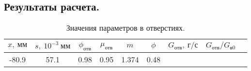 \documentclass[a4paper,10pt]{article}
\begin{document}
%    

    \subsection{Результаты расчета.}

    
    \begin{longtable}{
     |
%    
    c|
%    
    c|
%    
    c|
%    
    c|
%    
    c|
%    
    c|
%    
    c|
%    
    c|
%    
    c|
%    
    }
        \caption{Значения параметров в отверстиях.} \\
        \hline
%        

%        
        $x,\ мм$
%        

%        

%        
        & $s,\ 10^{-3}\ мм$
%        

%        

%        
        & $\phi_{отв}$
%        

%        

%        
        & $\mu_{отв}$
%        

%        

%        
        & $m$
%        

%        

%        
        & $\phi$
%        

%        

%        
        & $G_{отв},\ г/с$
%        

%        

%        
        & $G_{отв}/G_{в0}$
%        

%        
        \\
        \hline

%        

%        

%        
        -80.9
%        

%        

%        
        & 57.1
%        

%        

%        
        & 0.98
%        

%        

%        
        & 0.95
%        

%        

%        
        & 1.374
%        

%        

%        
        & 0.48
%        

%        


\end{longtable}
\end{document}
